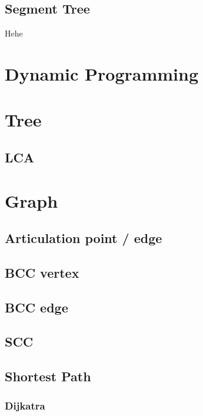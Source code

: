 \documentclass[10pt,twocolumn,oneside]{article} %
\begin{document}
\subsection{Segment Tree}

Hehe


\section{Dynamic Programming}


\section{Tree}

\subsection{LCA}


\section{Graph}

\subsection{Articulation point / edge}

\subsection{BCC vertex}

\subsection{BCC edge}

\subsection{SCC}

\subsection{Shortest Path}

\subsubsection{Dijkatra}
\end{document}
